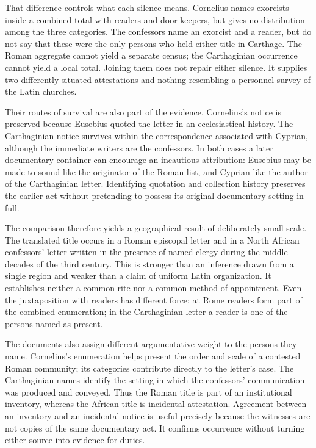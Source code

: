That difference controls what each silence means. Cornelius names exorcists
inside a combined total with readers and door-keepers, but gives no
distribution among the three categories. The confessors name an exorcist and
a reader, but do not say that these were the only persons who held either
title in Carthage. The Roman aggregate cannot yield a separate census; the
Carthaginian occurrence cannot yield a local total. Joining them does not
repair either silence. It supplies two differently situated attestations and
nothing resembling a personnel survey of the Latin churches.

Their routes of survival are also part of the evidence. Cornelius's notice is
preserved because Eusebius quoted the letter in an ecclesiastical history.
The Carthaginian notice survives within the correspondence associated with
Cyprian, although the immediate writers are the confessors. In both cases a
later documentary container can encourage an incautious attribution:
Eusebius may be made to sound like the originator of the Roman list, and
Cyprian like the author of the Carthaginian letter. Identifying quotation and
collection history preserves the earlier act without pretending to possess
its original documentary setting in full.

The comparison therefore yields a geographical result of deliberately small
scale. The translated title occurs in a Roman episcopal letter and in a North
African confessors' letter written in the presence of named clergy during the
middle decades of the third century. This
is stronger than an inference drawn from a single region and weaker than a
claim of uniform Latin organization. It establishes neither a common rite nor
a common method of appointment. Even the juxtaposition with readers has
different force: at Rome readers form part of the combined enumeration; in
the Carthaginian letter a reader is one of the persons named as present.

The documents also assign different argumentative weight to the persons they
name. Cornelius's enumeration helps present the order and scale of a contested
Roman community; its categories contribute directly to the letter's case.
The Carthaginian names identify the setting in which the confessors'
communication was produced and conveyed. Thus the Roman title is part of an
institutional inventory, whereas the African title is incidental
attestation. Agreement between an inventory and an incidental notice is
useful precisely because the witnesses are not copies of the same
documentary act. It confirms occurrence without turning either source into
evidence for duties.

